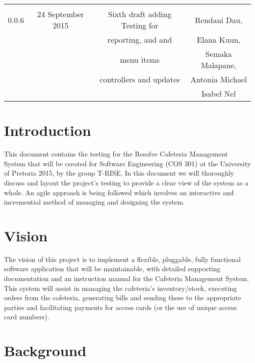 \documentclass[a4paper,12pt]{article}
\begin{document}
\begin{table}[h!]
\begin{tabular}{||c c c c||}
& & & \\
 \hline 
 & & & \\
 0.0.6 & 24 September 2015 &  Sixth draft adding Testing for  & Rendani Dau, \\ & & reporting, and and & Elana Kuun, \\ & & menu items & Semaka Malapane, \\ & & controllers and updates &  Antonia Michael \\ & & & Isabel Nel \\   [1ex] 
 \hline
 \end{tabular}
\end{table} 

\pagebreak
\section{Introduction}
This document contains the   testing for the Resolve Cafeteria Management System that will be created for Software Engineering (COS 301) at the University of Pretoria 2015, by the group T-RISE. In this document we will thoroughly discuss and layout the project's testing to provide a clear view of the system as a whole. An agile approach is being followed which involves an interactive and incremential method of managing and designing the system. 

\section{Vision}
The vision of this project is to implement a flexible, pluggable, fully functional software application that will be maintainable, with detailed supporting documentation and an instruction manual for the Cafeteria Management System. This system will assist in managing the cafeteria's inventory/stock, executing orders from the cafeteria, generating bills and sending these to the appropriate parties and facilitating payments for access cards (or the use of unique access card numbers). 

\section{Background}
\end{document}

